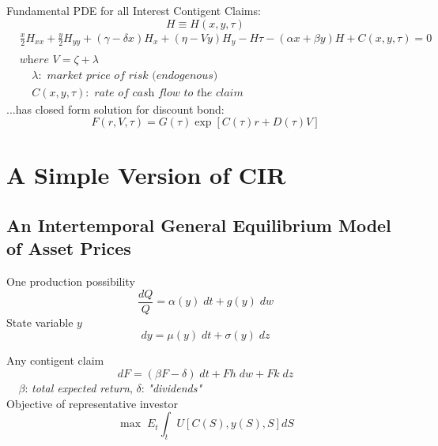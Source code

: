 \documentclass[
14pt,notheorems,hyperref={pdfauthor=whatever}
]{beamer}
\begin{document}
\begin{frame}
Fundamental PDE for all Interest Contigent Claims:
\[ H \equiv H(x,y,\tau)\]
\begin{align*}
    &\frac{x}{2}H_{xx}+\frac{y}{2}H_{yy}+(\gamma-\delta x)H_x + (\eta-V y)H_y - H\tau - (\alpha x + \beta y)H + C(x,y,\tau) = 0\\
    &\\
    & \textit{where } V = \zeta+\lambda\\
    & \;\;\;\; \lambda: \textit{ market price of risk (endogenous)}\\
    & \;\;\;\; C(x,y,\tau): \textit{ rate of cash flow to the claim}
\end{align*}
...has closed form solution for discount bond:
\[ F(r,V,\tau) = G(\tau)\exp{[C(\tau)r+D(\tau)V]}\]
\end{frame}

\section{A Simple Version of CIR}

\subsection{An Intertemporal General Equilibrium Model of Asset Prices}
\begin{frame}
One production possibility
\begin{equation} \tag{1}
    \frac{dQ}{Q} = \alpha(y)\;dt + g(y)\;dw
\end{equation}
\hfill\break
State variable $y$
\begin{equation} \tag{2}
    dy = \mu(y)\;dt + \sigma(y)\;dz
\end{equation}
\end{frame}

\begin{frame}
Any contigent claim
\begin{equation} \tag{3}
    dF = (\beta F - \delta)\;dt + F h\;dw + F k\;dz
\end{equation}
$\;\;\;\; \beta$: \textit{total expected return}, $\delta$: \textit{"dividends"}\\
\hfill\break
Objective of representative investor
\begin{equation} \tag{4}
    \max\;E_t \int_t U[C(S),y(S),S]dS
\end{equation}
\end{frame}
\end{document}
